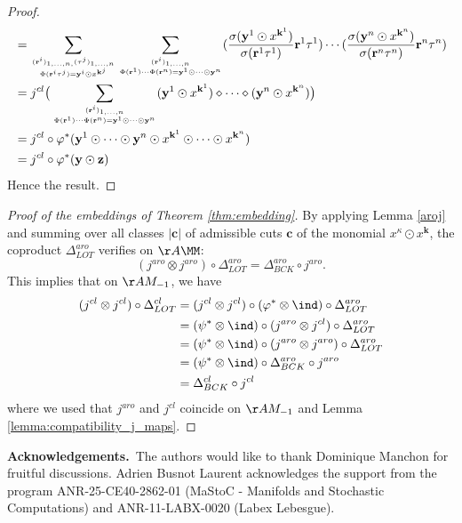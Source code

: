 \documentclass[a4paper,11pt]{article}
\begin{document}
\begin{proof}
\begin{align*}
& = \sum_{\genfrac{}{}{0pt}{2}{(\mathbf r^i)_{1,\ldots, n, }(\tau^j)_{1, \ldots, n}}  {\Phi(\mathbf r^i \tau^j)=\mathbf y^i\odot x^{\mathbf k^j}}} \sum_{\genfrac{}{}{0pt}{2}{(\mathbf r^i)_{1,\ldots, n }}{\Phi(\mathbf r^1)\cdots \Phi(\mathbf r^n)=\mathbf y^1\odot \cdots \odot \mathbf y^n}}(\frac{\sigma(\mathbf y^1 \odot x^{\mathbf k^1})}{\sigma(\mathbf r^1\tau^1)}\mathbf r^1\tau^1) \cdots (\frac{\sigma(\mathbf y^n \odot x^{\mathbf k^n})}{\sigma(\mathbf r^n\tau^n)}\mathbf r^n\tau^n)\\
& = j^{cl}\big(\sum_{\genfrac{}{}{0pt}{2}{(\mathbf r^i)_{1,\ldots, n }}{\Phi(\mathbf r^1)\cdots \Phi(\mathbf r^n)=\mathbf y^1\odot \cdots \odot \mathbf y^n}}(\mathbf y^1\odot x^{\mathbf k^1})\diamond \cdots \diamond(\mathbf y^n\odot x^{\mathbf k^n})\big)\\
& = j^{cl}\circ \varphi^*(\mathbf y^1\odot \cdots \odot \mathbf y^n\odot x^{\mathbf k^1}\odot \cdots \odot x^{\mathbf k^n})\\
& = j^{cl}\circ \varphi^*(\mathbf y \odot \mathbf z)
\end{align*}
Hence the result.
\end{proof}



\begin{proof}[Proof of the embeddings of Theorem \ref{thm:embedding}]
By applying Lemma \ref{aroj} and summing over all classes $\vert \mathbf c\vert$ of admissible cuts $\mathbf c$ of the monomial $x^{\kappa}\odot x^{\mathbf k}$, the coproduct $\Delta_{LOT}^{aro}$ verifies on $\AA \MM$:
\[
    (j^{aro}\otimes j^{aro})\circ \Delta_{LOT}^{aro}=\Delta_{BCK}^{aro}\circ j^{aro}.
\]
This implies that on $\AA M_{-1}$, we have
\begin{align*}
(j^{cl}\otimes j^{cl})\circ \Delta_{LOT}^{cl}
&=(j^{cl}\otimes j^{cl})\circ (\varphi^* \otimes \ind)\circ \Delta_{LOT}^{aro}\\
&=(\psi^*\otimes \ind) \circ (j^{aro}\otimes j^{cl})\circ \Delta_{LOT}^{aro}\\
&=(\psi^*\otimes \ind) \circ (j^{aro}\otimes j^{aro})\circ \Delta_{LOT}^{aro}\\
&=(\psi^*\otimes \ind)\circ \Delta_{BCK}^{aro}\circ j^{aro}\\
&=\Delta_{BCK}^{cl}\circ j^{cl}
\end{align*}
where we used that $j^{aro}$ and $j^{cl}$ coincide on $\AA M_{-1}$ and Lemma \ref{lemma:compatibility_j_maps}.
\end{proof}










\bigskip

\noindent \textbf{Acknowledgements.}\
The authors would like to thank Dominique Manchon for fruitful discussions.
Adrien Busnot Laurent acknowledges the support from the program ANR-25-CE40-2862-01 (MaStoC - Manifolds and Stochastic Computations) and ANR-11-LABX-0020 (Labex Lebesgue).






\end{document}
